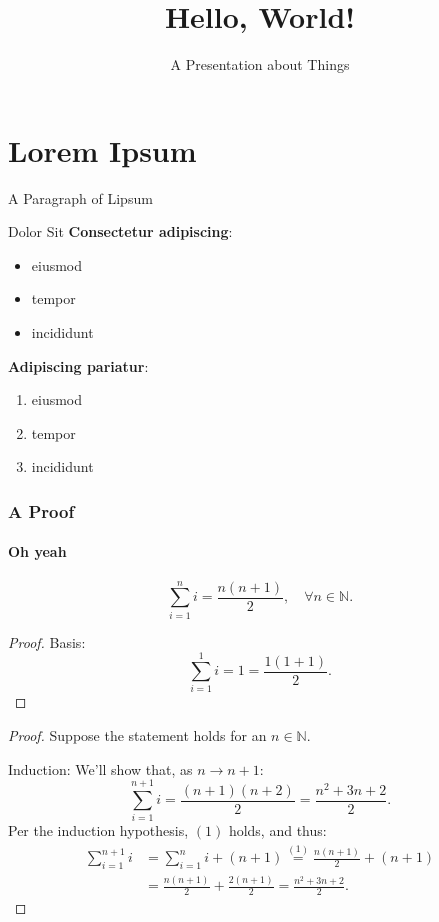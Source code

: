 \documentclass[notheorems]{beamer}
\title{Hello, World!}
\subtitle{A Presentation about Things}
\institute{University of Example}
\begin{document}
\maketitle

\section{Lorem Ipsum}

\begin{frame}{A Paragraph of Lipsum}
  \lipsum[1]
\end{frame}

\begin{frame}{Dolor Sit}
\textbf{Consectetur adipiscing}:
  \begin{itemize}
    \item eiusmod
    \item tempor
    \item incididunt
  \end{itemize}

\textbf{Adipiscing pariatur}:
  \begin{enumerate}
    \item eiusmod
    \item tempor
    \item incididunt
  \end{enumerate}
\end{frame}


\begin{frame}
  \frametitle{A Proof}
  \framesubtitle{Oh yeah}
  \begin{thm}
    \begin{equation*}
      \sum_{i=1}^n i = \frac{n(n+1)}{2},%
      \quad\forall n\in\mathbb{N}.
    \end{equation*}
  \end{thm}
  \begin{proof}\noqed
    Basis:
    \begin{equation*}
      \sum_{i=1}^1 i = 1 = \frac{1(1+1)}{2}.
    \end{equation*}
  \end{proof}
\end{frame}
\begin{frame}
  \begin{proof}
    Suppose the statement holds for an
    $n\in\mathbb{N}$.

    Induction:
    We'll show that, as $n\longrightarrow n+1$:
    \begin{equation*}
      \sum_{i=1}^{n+1} i = \frac{(n+1)(n+2)}{2}
      = \frac{n^2 + 3n + 2}{2}.
    \end{equation*}
    Per the induction hypothesis, $(1)$ holds, and thus:
    \begin{align*}
      \sum_{i=1}^{n+1} i
      &= \sum_{i=1}^{n} i + (n+1)
      \overset{(1)}{=} \frac{n(n+1)}{2} + (n+1) \\
      &= \frac{n(n+1)}{2} + \frac{2(n+1)}{2}
      = \frac{n^2 + 3n + 2}{2}.
    \end{align*}
  \end{proof}
\end{frame}

\end{document}
